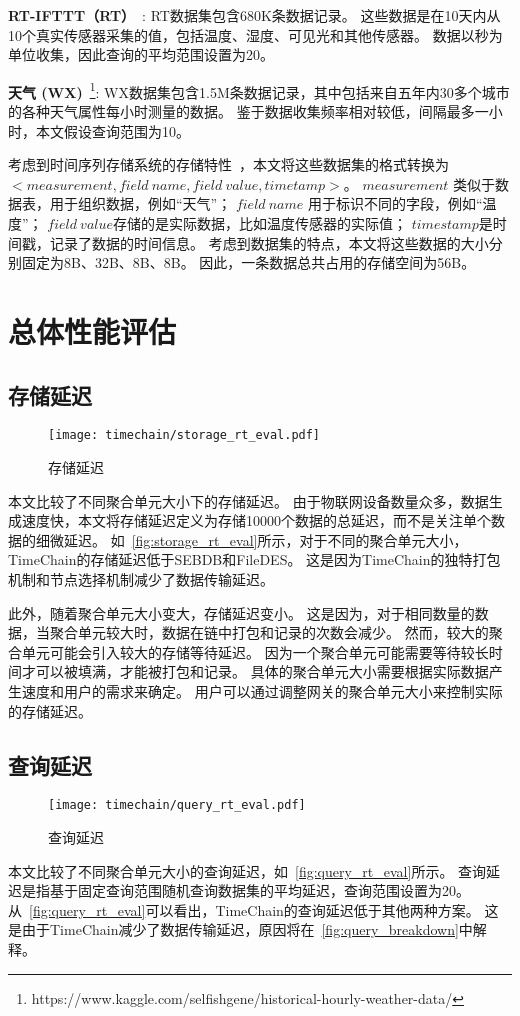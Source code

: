 \textbf{RT-IFTTT（RT）}~\cite{heo2017rt}:
RT数据集包含680K条数据记录。
这些数据是在10天内从10个真实传感器采集的值，包括温度、湿度、可见光和其他传感器。
数据以秒为单位收集，因此查询的平均范围设置为20。

\textbf{天气 (WX)}~\footnote{https://www.kaggle.com/selfishgene/historical-hourly-weather-data/}:
WX数据集包含1.5M条数据记录，其中包括来自五年内30多个城市的各种天气属性每小时测量的数据。
鉴于数据收集频率相对较低，间隔最多一小时，本文假设查询范围为10。

考虑到时间序列存储系统的存储特性~\cite{naqvi2017time}，本文将这些数据集的格式转换为\\ $<measurement, field~name, field~value, timetamp>$。
$measurement$ 类似于数据表，用于组织数据，例如“天气”；
$field~name$ 用于标识不同的字段，例如“温度”；
$field~value$存储的是实际数据，比如温度传感器的实际值；
$timestamp$是时间戳，记录了数据的时间信息。
考虑到数据集的特点，本文将这些数据的大小分别固定为8B、32B、8B、8B。
因此，一条数据总共占用的存储空间为56B。

\section{总体性能评估}

\subsection{存储延迟}
\begin{figure}[t]
    \centering
    \texttt{[image: timechain/storage\_rt\_eval.pdf]}
    \caption{存储延迟}
    \label{fig:storage_rt_eval}
\end{figure}
本文比较了不同聚合单元大小下的存储延迟。
由于物联网设备数量众多，数据生成速度快，本文将存储延迟定义为存储10000个数据的总延迟，而不是关注单个数据的细微延迟。
如~\autoref{fig:storage_rt_eval}所示，对于不同的聚合单元大小，TimeChain的存储延迟低于SEBDB和FileDES。
这是因为TimeChain的独特打包机制和节点选择机制减少了数据传输延迟。

此外，随着聚合单元大小变大，存储延迟变小。
这是因为，对于相同数量的数据，当聚合单元较大时，数据在链中打包和记录的次数会减少。
然而，较大的聚合单元可能会引入较大的存储等待延迟。
因为一个聚合单元可能需要等待较长时间才可以被填满，才能被打包和记录。
具体的聚合单元大小需要根据实际数据产生速度和用户的需求来确定。
用户可以通过调整网关的聚合单元大小来控制实际的存储延迟。

\subsection{查询延迟}
\begin{figure}[t]
    \centering
    \texttt{[image: timechain/query\_rt\_eval.pdf]}
    \caption{查询延迟}
    \label{fig:query_rt_eval}
\end{figure}
本文比较了不同聚合单元大小的查询延迟，如~\autoref{fig:query_rt_eval}所示。
查询延迟是指基于固定查询范围随机查询数据集的平均延迟，查询范围设置为20。
从~\autoref{fig:query_rt_eval}可以看出，TimeChain的查询延迟低于其他两种方案。
这是由于TimeChain减少了数据传输延迟，原因将在~\autoref{fig:query_breakdown}中解释。

